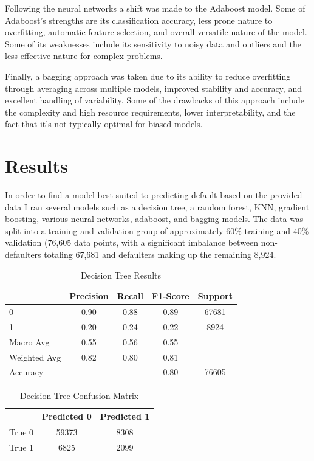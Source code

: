 \documentclass[12pt]{article}
\begin{document}
Following the neural networks a shift was made to the Adaboost model. Some of Adaboost's strengths are its classification accuracy, less prone nature to overfitting, automatic feature selection, and overall versatile nature of the model. Some of its weaknesses include its sensitivity to noisy data and outliers and the less effective nature for complex problems.

Finally, a bagging approach was taken due to its ability to reduce overfitting through averaging across multiple models, improved stability and accuracy, and excellent handling of variability. Some of the drawbacks of this approach include the complexity and high resource requirements, lower interpretability, and the fact that it's not typically optimal for biased models.

\section{Results}
\label{sec:resu}

In order to find a model best suited to predicting default based on the provided data I ran several models such as a decision tree, a random forest, KNN, gradient boosting, various neural networks, adaboost, and bagging models. The data was split into a training and validation group of approximately 60\% training and 40\% validation (76,605 data points, with a significant imbalance between non-defaulters totaling 67,681 and defaulters making up the remaining 8,924.

\begin{table}[htbp]
    \centering
    \caption{Decision Tree Results}
    \begin{tabular}{lcccc}
        \toprule
        & Precision & Recall & F1-Score & Support \\
        \midrule
        0 & 0.90 & 0.88 & 0.89 & 67681 \\
        1 & 0.20 & 0.24 & 0.22 & 8924 \\
        Macro Avg & 0.55 & 0.56 & 0.55 & \\
        Weighted Avg & 0.82 & 0.80 & 0.81 & \\
        \midrule
        Accuracy & & & 0.80 & 76605 \\
        \bottomrule
    \end{tabular}
    \label{table:decisionTreeResults}
\end{table}

\begin{table}[htbp]
    \centering
    \caption{Decision Tree Confusion Matrix}
    \begin{tabular}{lcc}
        \toprule
        & Predicted 0 & Predicted 1 \\
        \midrule
        True 0 & 59373 & 8308 \\
        True 1 & 6825 & 2099 \\
        \bottomrule
    \end{tabular}
    \label{table:decisionTreeConfusionMatrix}
\end{table}
\end{document}
